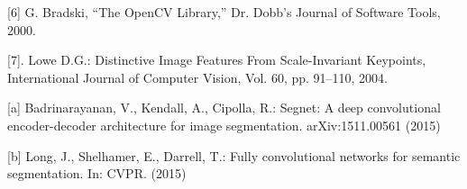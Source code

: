 \documentclass{article}
\begin{document}
[6] G. Bradski, “The OpenCV Library,” Dr. Dobb’s
Journal of Software Tools, 2000.

[7]. Lowe D.G.: Distinctive Image Features From Scale-Invariant Keypoints, International
Journal of Computer Vision, Vol. 60, pp. 91–110, 2004.

[a] Badrinarayanan, V., Kendall, A., Cipolla, R.: Segnet: A deep convolutional
encoder-decoder architecture for image segmentation. arXiv:1511.00561 (2015)

[b] Long, J., Shelhamer, E., Darrell, T.: Fully convolutional networks for semantic
segmentation. In: CVPR. (2015)
\end{document}
